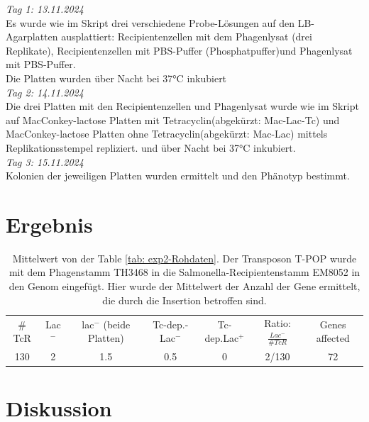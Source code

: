 \documentclass[oneside,10pt,a4paper]{report}
\begin{document}
		\textit{Tag 1: 13.11.2024}\\
		Es wurde wie im Skript \cite{Mibi-Script} drei verschiedene Probe-Lösungen auf den LB-Agarplatten ausplattiert: Recipientenzellen mit dem Phagenlysat (drei Replikate), Recipientenzellen mit PBS-Puffer (Phosphatpuffer)und Phagenlysat mit PBS-Puffer.\\
		Die Platten wurden über Nacht bei 37°C inkubiert
		\\
		\textit{Tag 2: 14.11.2024}\\
		Die drei Platten mit den Recipientenzellen und Phagenlysat wurde wie im Skript \cite{Mibi-Script} auf MacConkey-lactose Platten mit Tetracyclin(abgekürzt: Mac-Lac-Tc) und MacConkey-lactose Platten ohne Tetracyclin(abgekürzt: Mac-Lac) mittels Replikationsstempel repliziert. und über Nacht bei 37°C inkubiert.\\
		\textit{Tag 3: 15.11.2024}\\
		Kolonien der jeweiligen Platten wurden ermittelt und den Phänotyp bestimmt.
		\section{Ergebnis}
			\begin{table}[H]
			\centering
			\caption{Mittelwert von der Table \ref{tab: exp2-Rohdaten}. Der Transposon T-POP wurde mit dem Phagenstamm TH3468 in die Salmonella-Recipientenstamm EM8052 in den Genom eingefügt. Hier wurde der Mittelwert der Anzahl der Gene ermittelt, die durch die Insertion betroffen sind.}
			\label{tab: exp2-ergebnis}
			\begin{tabular}{ccccccc}
				\toprule
			\multirow{2}{*}{$\#$TcR} & \multirow{2}{*}{Lac$^-$}&\multirow{2}{*}{lac$^-$ (beide Platten)} & \multirow{2}{*}{Tc-dep.-Lac$^-$}& \multirow{2}{*}{Tc-dep.Lac$^+$}& \multirow{2}{*}{Ratio: $\frac{Lac^-}{\#TcR}$}&\multirow{2}{*}{\parbox[*]{1.2cm}{Genes affected}}\\
				&&&&&&\\
				\midrule
				130 & 2 & 1.5 & 0.5 & 0 & 2/130 & 72\\
				\bottomrule			
			\end{tabular}
		\end{table}
		\section{Diskussion}

	
\end{document}
